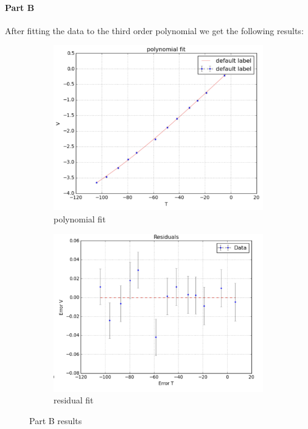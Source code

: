 \documentclass[12pt,a4paper]{report}
\begin{document}
\paragraph{Part B}
After fitting the data to the third order polynomial we get the following results:

\begin{figure}[htbp]
    \centering
    \begin{subfigure}[b]{0.48\textwidth}
      \includegraphics[width=\textwidth]{Part B results/polynomial-fit.png}
      \caption{polynomial fit}
      \label{fig:partB1}
    \end{subfigure}
    \hfill
    \begin{subfigure}[b]{0.48\textwidth}
      \includegraphics[width=\textwidth]{Part B results/polynomial residual.png}
      \caption{residual fit}
      \label{fig:partB2}
    \end{subfigure}
    \caption{Part B results}
    \label{fig:partB_results}
  \end{figure}
  
\end{document}
